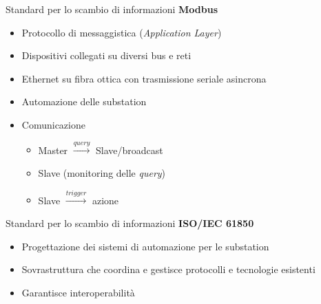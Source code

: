 \begin{frame}{Standard per lo scambio di informazioni}
	\textbf{Modbus}
	\begin{itemize}[<+- | alert@+>]
		\item Protocollo di messaggistica (\textit{Application Layer})
		\item Dispositivi collegati su diversi bus e reti
		\item Ethernet su fibra ottica con trasmissione seriale asincrona
		\item Automazione delle substation
		\item Comunicazione
			\begin{itemize}[<+- | alert@+>]
			\item Master $\xrightarrow{query}$ Slave/broadcast
			\item Slave (monitoring delle \textit{query})
			\item Slave $\xrightarrow{trigger}$ azione
			\end{itemize}
	\end{itemize}
\end{frame}


\begin{frame}{Standard per lo scambio di informazioni}
	\textbf{ISO/IEC 61850}
	\begin{itemize}[<+- | alert@+>]
		\item Progettazione dei sistemi di automazione per le substation
		\item Sovrastruttura che coordina e gestisce protocolli e tecnologie esistenti
		\item Garantisce interoperabilità
	\end{itemize}
\end{frame}

